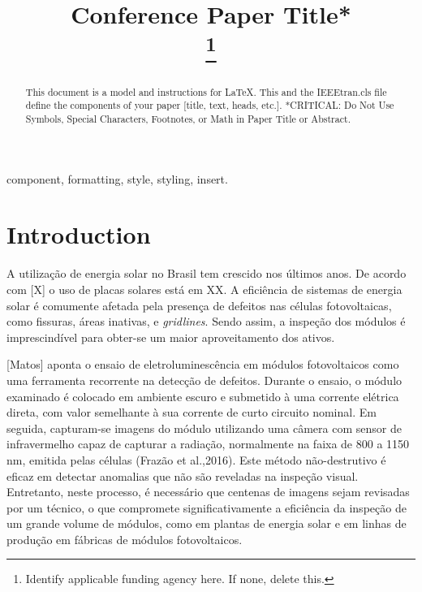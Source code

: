 \documentclass[conference]{IEEEtran}
\begin{document}
\title{Conference Paper Title*\\
    \thanks{Identify applicable funding agency here. If none, delete this.}
}

\author{
}

\maketitle

\begin{abstract}
    This document is a model and instructions for \LaTeX.
    This and the IEEEtran.cls file define the components of your paper [title,
            text, heads, etc.]. *CRITICAL: Do Not Use Symbols, Special
    Characters,
    Footnotes,
    or Math in Paper Title or Abstract.
\end{abstract}

\begin{IEEEkeywords}
    component, formatting, style, styling, insert.
\end{IEEEkeywords}

\section{Introduction}
A utilização de energia solar no Brasil tem crescido nos últimos anos. De
acordo com [X] o uso de
placas solares está em XX. A eficiência de sistemas de energia solar é
comumente afetada pela presença de
defeitos nas células fotovoltaicas, como fissuras, áreas inativas,
e \textit{gridlines}. Sendo assim, a inspeção dos módulos é imprescindível para
obter-se um maior aproveitamento dos ativos.

    [Matos] aponta o ensaio de eletroluminescência
em módulos fotovoltaicos como uma ferramenta recorrente na detecção de
defeitos. Durante o ensaio, o módulo examinado é colocado em ambiente escuro e
submetido à uma corrente elétrica direta, com valor semelhante à sua corrente
de curto circuito nominal.  Em seguida, capturam-se imagens do módulo
utilizando uma câmera com sensor de infravermelho capaz de capturar a radiação,
normalmente na faixa de 800
a 1150 nm, emitida pelas células (Frazão et al.,2016). Este método
não-destrutivo é eficaz em detectar anomalias que não são
reveladas na
inspeção visual. Entretanto, neste processo, é necessário que centenas de
imagens sejam revisadas por um técnico, o que compromete
significativamente a eficiência da inspeção de um grande volume de módulos,
como em plantas de energia
solar e em linhas de produção em fábricas de módulos fotovoltaicos.
\end{document}
